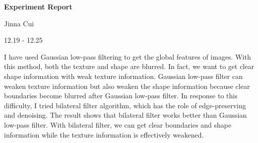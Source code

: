 \documentclass{article}
\begin{document}


\pagestyle{fancy}
\begin{center}
\textbf{\LARGE{Experiment Report}} %
\end{center}

\begin{center}
Jinna Cui
\end{center}

\begin{center}
12.19 - 12.25
\end{center}


I have used Gaussian low-pass filtering to get the global features of images. With this method, both the texture and shape are blurred. In fact, we want to get clear shape information with weak texture information. Gaussian low-pass filter can weaken texture information but also weaken the shape information because clear boundaries become blurred after Gaussian low-pass filter. In response to this difficulty, I tried bilateral filter algorithm, which has the role of edge-preserving and denoising. The result shows that bilateral filter works better than Gaussian low-pass filter. With bilateral filter, we can get clear boundaries and shape information while the texture information is effectively weakened. 
\end{document}
